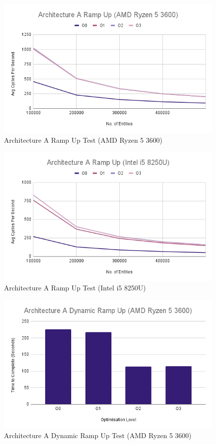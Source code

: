 \documentclass{article}
\begin{document}
\begin{figure}[!h]
\centering
\includegraphics[scale=0.5]{Architecture A Ramp Up (AMD Ryzen 5 3600).png}
\caption{Architecture A Ramp Up Test (AMD Ryzen 5 3600)}
\label{arch_a_ramp_up_pc}
\end{figure}

\begin{figure}[!h]
\centering
\includegraphics[scale=0.5]{Architecture A Ramp Up (Intel i5 8250U).png}
\caption{Architecture A Ramp Up Test (Intel i5 8250U)}
\label{arch_a_ramp_up_laptop}
\end{figure}

\begin{figure}[!h]
\centering
\includegraphics[scale=0.5]{Architecture A Dynamic Ramp Up (AMD Ryzen 5 3600).png}
\caption{Architecture A Dynamic Ramp Up Test (AMD Ryzen 5 3600)}
\label{arch_a_dynamic_ramp_up_pc}
\end{figure}
\end{document}
